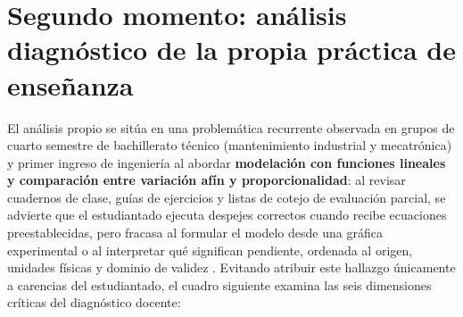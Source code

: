 \documentclass[spanish,letterpaper,oneside]{article}
\begin{document}
\section{Segundo momento: análisis diagnóstico de la propia práctica de enseñanza}
El análisis propio se sitúa en una problemática recurrente observada en grupos de cuarto semestre de bachillerato técnico (mantenimiento industrial y mecatrónica) y primer ingreso de ingeniería al abordar \textbf{modelación con funciones lineales y comparación entre variación afín y proporcionalidad}: al revisar cuadernos de clase, guías de ejercicios y listas de cotejo de evaluación parcial, se advierte que el estudiantado ejecuta despejes correctos cuando recibe ecuaciones preestablecidas, pero fracasa al formular el modelo desde una gráfica experimental o al interpretar qué significan pendiente, ordenada al origen, unidades físicas y dominio de validez \citep{star2015algebra}. Evitando atribuir este hallazgo únicamente a carencias del estudiantado, el cuadro siguiente examina las seis dimensiones críticas del diagnóstico docente:
\end{document}
